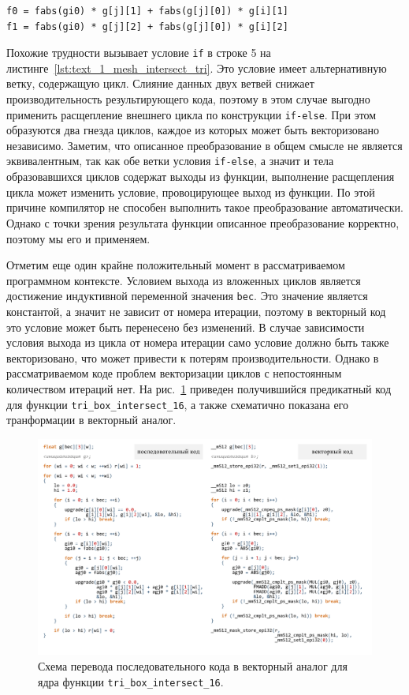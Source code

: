 \begin{lstlisting}[caption={Использование тождества для векторизации условия.},label={lst:text_4_mesh_intersect_tozh}]
f0 = fabs(gi0) * g[j][1] + fabs(g[j][0]) * g[i][1]
f1 = fabs(gi0) * g[j][2] + fabs(g[j][0]) * g[i][2]
\end{lstlisting}

Похожие трудности вызывает условие \texttt{if} в строке 5 на листинге~\ref{lst:text_1_mesh_intersect_tri}.
Это условие имеет альтернативную ветку, содержащую цикл.
Слияние данных двух ветвей снижает производительность результирующего кода, поэтому в этом случае выгодно применить расщепление внешнего цикла по конструкции \texttt{if-else}.
При этом образуются два гнезда циклов, каждое из которых может быть векторизовано независимо.
Заметим, что описанное преобразование в общем смысле не является эквивалентным, так как обе ветки условия \texttt{if-else}, а значит и тела образовавшихся циклов содержат выходы из функции, выполнение расщепления цикла может изменить условие, провоцирующее выход из функции.
По этой причине компилятор не способен выполнить такое преобразование автоматически.
Однако с точки зрения результата функции описанное преобразование корректно, поэтому мы его и применяем.

Отметим еще один крайне положительный момент в рассматриваемом программном контексте.
Условием выхода из вложенных циклов является достижение индуктивной переменной значения \texttt{bec}.
Это значение является константой, а значит не зависит от номера итерации, поэтому в векторный код это условие может быть перенесено без изменений.
В случае зависимости условия выхода из цикла от номера итерации само условие должно быть также векторизовано, что может привести к потерям производительности.
Однако в рассматриваемом коде проблем векторизации циклов с непостоянным количеством итераций нет.
На рис.~\ref{fig:text_1_mesh_intersect_scheme} приведен получившийся предикатный код для функции \texttt{tri\_box\_intersect\_16}, а также схематично показана его транформации в векторный аналог.

\begin{figure}[ht]
	\centering
	\includegraphics[width=1.0\textwidth]{./pics/text_4_mesh_intersect/final_scheme.pdf}
	\caption{Схема перевода последовательного кода в векторный аналог для ядра функции \texttt{tri\_box\_intersect\_16}.}
	\label{fig:text_1_mesh_intersect_scheme}
\end{figure}


